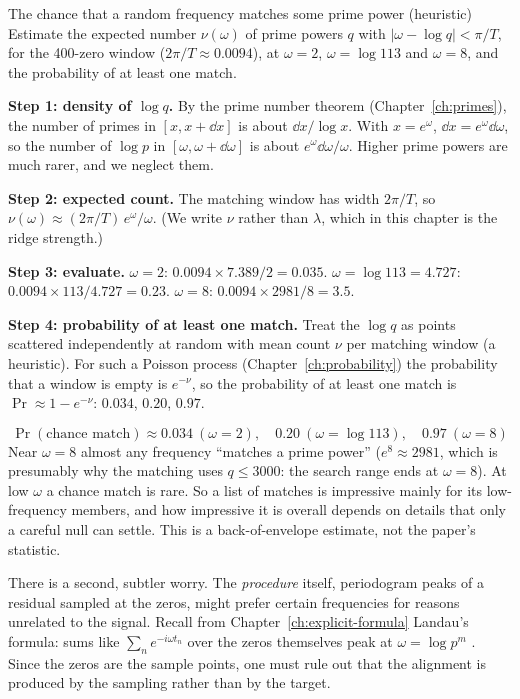 \begin{sample}{The chance that a random frequency matches some prime power (heuristic)}
Estimate the expected number $\nu(\omega)$ of prime powers $q$ with $|\omega-\log q|<\pi/T$, for the 400-zero window ($2\pi/T\approx0.0094$), at $\omega=2$, $\omega=\log113$ and $\omega=8$, and the probability of at least one match.

\textbf{Step 1: density of $\log q$.} By the prime number theorem (Chapter~\ref{ch:primes}), the number of primes in $[x,x+\dd x]$ is about $\dd x/\log x$. With $x=e^\omega$, $\dd x=e^\omega\dd\omega$, so the number of $\log p$ in $[\omega,\omega+\dd\omega]$ is about $e^\omega\dd\omega/\omega$. Higher prime powers are much rarer, and we neglect them.

\textbf{Step 2: expected count.} The matching window has width $2\pi/T$, so $\nu(\omega)\approx(2\pi/T)\,e^\omega/\omega$. (We write $\nu$ rather than $\lambda$, which in this chapter is the ridge strength.)

\textbf{Step 3: evaluate.} $\omega=2$: $0.0094\times7.389/2=0.035$. $\omega=\log113=4.727$: $0.0094\times113/4.727=0.23$. $\omega=8$: $0.0094\times2981/8=3.5$.

\textbf{Step 4: probability of at least one match.} Treat the $\log q$ as points scattered independently at random with mean count $\nu$ per matching window (a heuristic). For such a Poisson process (Chapter~\ref{ch:probability}) the probability that a window is empty is $e^{-\nu}$, so the probability of at least one match is $\Pr\approx1-e^{-\nu}$: $0.034$, $0.20$, $0.97$.

\[
\boxed{\Pr(\text{chance match})\approx0.034\ (\omega=2),\quad0.20\ (\omega=\log113),\quad0.97\ (\omega=8)}
\]
Near $\omega=8$ almost any frequency ``matches a prime power'' ($e^8\approx2981$, which is presumably why the matching uses $q\le3000$: the search range ends at $\omega=8$). At low $\omega$ a chance match is rare. So a list of matches is impressive mainly for its low-frequency members, and how impressive it is overall depends on details that only a careful null can settle. This is a back-of-envelope estimate, not the paper's statistic.
\end{sample}

There is a second, subtler worry. The \emph{procedure} itself, periodogram peaks of a residual sampled at the zeros, might prefer certain frequencies for reasons unrelated to the signal. Recall from Chapter~\ref{ch:explicit-formula} Landau's formula: sums like $\sum_n e^{-i\omega t_n}$ over the zeros themselves peak at $\omega=\log p^m$ \cite{landau,gonek}. Since the zeros are the sample points, one must rule out that the alignment is produced by the sampling rather than by the target.

